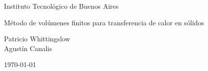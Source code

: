 \begin{titlepage}

\centering
{\small Instituto Tecnológico de Buenos Aires \par}


\vspace{8cm}
{\Huge Método de volúmenes finitos para transferencia de calor en sólidos \par}
\vspace{2cm}
{ \large {Patricio Whittingslow   \\
 Agustín Canalis\par}}
\vspace{4cm}
\today

\end{titlepage}